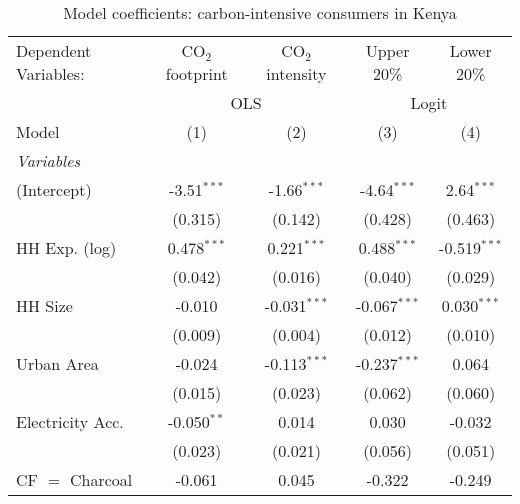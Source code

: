 
\begin{table}[htbp!]
   \centering
   \small
   \begin{adjustbox}{width = 1\textwidth, max height = 0.95\textheight, center}
      \begin{threeparttable}[b]
         \caption{\label{tab:Logit_1_KEN} Model coefficients: carbon-intensive consumers in Kenya}
         \begin{tabular}{lcccc}
            \tabularnewline \midrule \midrule
            Dependent Variables: & CO$_{2}$ footprint & CO$_{2}$ intensity & Upper 20\%     & Lower 20\%\\   
             & \multicolumn{2}{c}{OLS} & \multicolumn{2}{c}{Logit} \\ 
            Model                & (1)                & (2)                & (3)            & (4)\\  
            \midrule
            \emph{Variables}\\
            (Intercept)          & -3.51$^{***}$      & -1.66$^{***}$      & -4.64$^{***}$  & 2.64$^{***}$\\   
                                 & (0.315)            & (0.142)            & (0.428)        & (0.463)\\   
            HH Exp. (log)        & 0.478$^{***}$      & 0.221$^{***}$      & 0.488$^{***}$  & -0.519$^{***}$\\   
                                 & (0.042)            & (0.016)            & (0.040)        & (0.029)\\   
            HH Size              & -0.010             & -0.031$^{***}$     & -0.067$^{***}$ & 0.030$^{***}$\\   
                                 & (0.009)            & (0.004)            & (0.012)        & (0.010)\\   
            Urban Area           & -0.024             & -0.113$^{***}$     & -0.237$^{***}$ & 0.064\\   
                                 & (0.015)            & (0.023)            & (0.062)        & (0.060)\\   
            Electricity Acc.     & -0.050$^{**}$      & 0.014              & 0.030          & -0.032\\   
                                 & (0.023)            & (0.021)            & (0.056)        & (0.051)\\   
            CF $=$ Charcoal      & -0.061             & 0.045              & -0.322         & -0.249\\   

\end{tabular}
\end{threeparttable}
\end{adjustbox}
\end{table}
